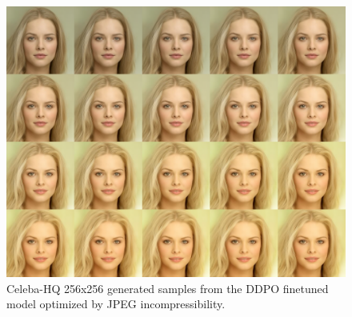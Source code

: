 \begin{appendixs}
        \begin{figure}
            \centering
            \includegraphics[scale=1.40]{img/results/incompressibility_8.png}
            \vspace{-0pt}  %
            \captionsetup{width=\textwidth} %
            \caption{Celeba-HQ 256x256 generated samples from the DDPO finetuned model optimized by JPEG incompressibility.}
            \label{fig:ddpm-to-ddpo-incompressibility-extra1}
        \end{figure}



\end{appendixs}
